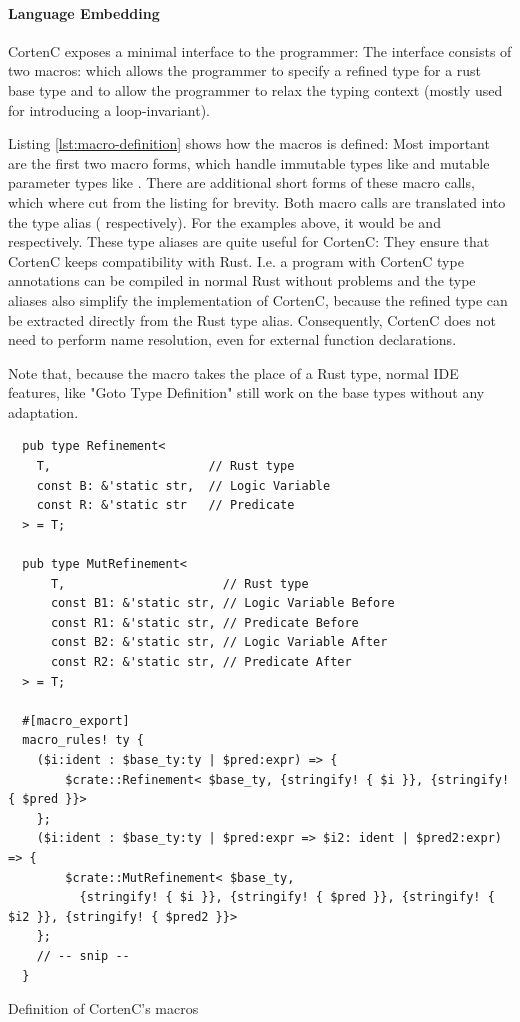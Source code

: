 \documentclass[twoside, english]{sdqthesis}
\theoremstyle{definition}
\begin{document}
\paragraph{Language Embedding}
CortenC exposes a minimal interface to the programmer: The interface consists of two macros:
 which allows the programmer to specify a refined type for a rust base type and
 to allow the programmer to relax the typing context (mostly used for introducing a loop-invariant). 

Listing \ref{lst:macro-definition} shows how the  macros is defined: Most important are the first two macro forms, which handle immutable types like  and mutable parameter types like . 
There are additional short forms of these macro calls, which where cut from the listing for brevity. Both macro calls are translated into the type alias  ( respectively). For the examples above, it would be  and  respectively. These type aliases are quite useful for CortenC: They ensure that CortenC keeps compatibility with Rust. I.e. a program with CortenC type annotations can be compiled in normal Rust without problems and the type aliases also simplify the implementation of CortenC, because the refined type can be extracted directly from the Rust type alias. Consequently, CortenC does not need to perform name resolution, even for external function declarations.

Note that, because the  macro takes the place of a Rust type, normal IDE features, like "Goto Type Definition" still work on the base types without any adaptation.

\begin{listing}[ht]
  \begin{verbatim}
  pub type Refinement<
    T,                      // Rust type
    const B: &'static str,  // Logic Variable
    const R: &'static str   // Predicate
  > = T;

  pub type MutRefinement<
      T,                      // Rust type
      const B1: &'static str, // Logic Variable Before
      const R1: &'static str, // Predicate Before
      const B2: &'static str, // Logic Variable After
      const R2: &'static str, // Predicate After
  > = T;

  #[macro_export]
  macro_rules! ty {
    ($i:ident : $base_ty:ty | $pred:expr) => {
        $crate::Refinement< $base_ty, {stringify! { $i }}, {stringify! { $pred }}>
    };
    ($i:ident : $base_ty:ty | $pred:expr => $i2: ident | $pred2:expr) => {
        $crate::MutRefinement< $base_ty, 
          {stringify! { $i }}, {stringify! { $pred }}, {stringify! { $i2 }}, {stringify! { $pred2 }}>
    };
    // -- snip --
  }
  \end{verbatim}
  \caption{Definition of CortenC's macros}
  \label{lst:macro-definition}
\end{listing}
\end{document}
